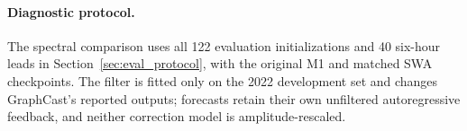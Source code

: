 \documentclass{article}
\newcommand{\vfourchange}[1]{{\color{blue}#1}}
\newcommand{\vfourred}[1]{{\color{red}#1}}
\newif\ifvfivechanges
\newcommand{\vfiveidentity}[1]{#1}
\DeclareRobustCommand{\vfiveadded}[1]{\ifvfivechanges{\color{vfiveAdded}%
  \let\vfourchange\vfiveidentity\let\vfourred\vfiveidentity#1}\else{\color{blue}%
  \let\vfourchange\vfiveidentity\let\vfourred\vfiveidentity#1}\fi}
\DeclareRobustCommand{\vfiveRone}[1]{\ifvfivechanges{\color{vfiveDeleted}\sout{#1}}\,\fi\vfiveadded{R1}}
\begin{document}
\paragraph{\vfourred{Diagnostic protocol.}}
\vfourred{The spectral comparison uses all 122 evaluation initializations and 40 six-hour leads in Section~\ref{sec:eval_protocol}, with the original M1 and matched \vfiveRone{reset/reset} SWA checkpoints. The filter is fitted only on the 2022 development set and changes GraphCast's reported outputs; forecasts retain their own unfiltered autoregressive feedback, and neither correction model is amplitude-rescaled.}
\end{document}

